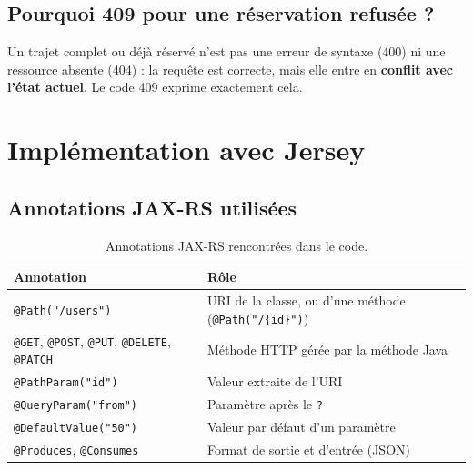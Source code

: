 \documentclass[11pt,a4paper]{article}
\begin{document}
\subsection{Pourquoi 409 pour une r\'eservation refus\'ee ?}
Un trajet complet ou d\'ej\`a r\'eserv\'e n'est pas une erreur de syntaxe (400) ni une ressource absente (404) : la requ\^ete est correcte, mais elle entre en \textbf{conflit avec l'\'etat actuel}. Le code 409 exprime exactement cela.

\section{Impl\'ementation avec Jersey}

\subsection{Annotations JAX-RS utilis\'ees}
\begin{table}[htbp]\centering
\begin{tabularx}{\textwidth}{@{}L{3.6cm}X@{}}
\toprule
\textbf{Annotation} & \textbf{R\^ole}\\
\midrule
\texttt{@Path("/users")} & URI de la classe, ou d'une m\'ethode (\texttt{@Path("/\{id\}")})\\
\texttt{@GET}, \texttt{@POST}, \texttt{@PUT}, \texttt{@DELETE}, \texttt{@PATCH} & M\'ethode HTTP g\'er\'ee par la m\'ethode Java\\
\texttt{@PathParam("id")} & Valeur extraite de l'URI\\
\texttt{@QueryParam("from")} & Param\`etre apr\`es le \texttt{?}\\
\texttt{@DefaultValue("50")} & Valeur par d\'efaut d'un param\`etre\\
\texttt{@Produces}, \texttt{@Consumes} & Format de sortie et d'entr\'ee (JSON)\\
\bottomrule
\end{tabularx}
\caption{Annotations JAX-RS rencontr\'ees dans le code.}
\end{table}
\end{document}
